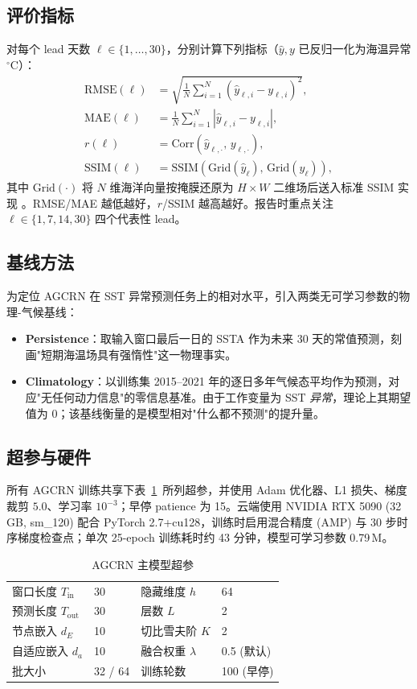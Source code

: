 \subsection{评价指标}
对每个 lead 天数 $\ell\in\{1,\ldots,30\}$，分别计算下列指标（$\hat y, y$ 已反归一化为海温异常 $^{\circ}$C）：
\begin{align}
\text{RMSE}(\ell) &= \sqrt{\tfrac{1}{N}\sum_{i=1}^{N}(\hat y_{\ell,i}-y_{\ell,i})^2}, \\
\text{MAE}(\ell)  &= \tfrac{1}{N}\sum_{i=1}^{N}|\hat y_{\ell,i}-y_{\ell,i}|, \\
r(\ell) &= \mathrm{Corr}(\hat y_{\ell,\cdot},\, y_{\ell,\cdot}), \\
\text{SSIM}(\ell) &= \mathrm{SSIM}(\mathrm{Grid}(\hat y_\ell),\,\mathrm{Grid}(y_\ell)),
\end{align}
其中 $\mathrm{Grid}(\cdot)$ 将 $N$ 维海洋向量按掩膜还原为 $H\!\times\!W$ 二维场后送入标准 SSIM 实现 \citep{wang2004ssim}。RMSE/MAE 越低越好，$r$/SSIM 越高越好。报告时重点关注 $\ell\in\{1, 7, 14, 30\}$ 四个代表性 lead。

\subsection{基线方法}
为定位 AGCRN 在 SST 异常预测任务上的相对水平，引入两类无可学习参数的物理-气候基线：
\begin{itemize}
    \item \textbf{Persistence}：取输入窗口最后一日的 SSTA 作为未来 30 天的常值预测，刻画"短期海温场具有强惰性"这一物理事实。
    \item \textbf{Climatology}：以训练集 2015--2021 年的逐日多年气候态平均作为预测，对应"无任何动力信息"的零信息基准。由于工作变量为 SST \emph{异常}，理论上其期望值为 0；该基线衡量的是模型相对"什么都不预测"的提升量。
\end{itemize}

\subsection{超参与硬件}
所有 AGCRN 训练共享下表~\ref{tab:hyper}~所列超参，并使用 Adam 优化器、L1 损失、梯度裁剪 $5.0$、学习率 $10^{-3}$；早停 patience 为 15。云端使用 NVIDIA RTX 5090 (32\,GB, sm\_120) 配合 PyTorch 2.7+cu128，训练时启用混合精度 (AMP) 与 30 步时序梯度检查点；单次 25-epoch 训练耗时约 43 分钟，模型可学习参数 0.79\,M。

\begin{table}[ht]
\centering
\caption{AGCRN 主模型超参}
\label{tab:hyper}
\begin{tabular}{ll|ll}
\hline
窗口长度 $T_\text{in}$ & 30 & 隐藏维度 $h$ & 64 \\
预测长度 $T_\text{out}$ & 30 & 层数 $L$ & 2 \\
节点嵌入 $d_E$ & 10 & 切比雪夫阶 $K$ & 2 \\
自适应嵌入 $d_a$ & 10 & 融合权重 $\lambda$ & 0.5 (默认) \\
批大小 & 32 / 64 & 训练轮数 & 100 (早停) \\
\hline
\end{tabular}
\end{table}

